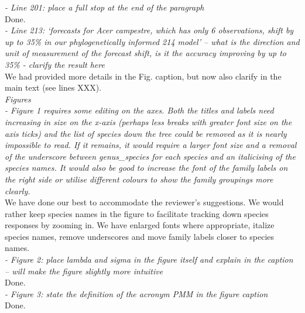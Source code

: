\documentclass[11pt]{article}
\begin{document}

\emph{- Line 201: place a full stop at the end of the paragraph}\\
Done.\\

\emph{- Line 213: ‘forecasts for Acer campestre, which has only 6 observations, shift by up to 35\% in our phylogenetically informed 214 model’ – what is the direction and unit of measurement of the forecast shift, is it the accuracy improving by up to 35\% - clarify the result here}\\
We had provided more details in the Fig. caption, but now also clarify in the main text (see lines XXX).\\


\emph{Figures}\\
\emph{- Figure 1 requires some editing on the axes. Both the titles and labels need increasing in size on the x-axis (perhaps less breaks with greater font size on the axis ticks) and the list of species down the tree could be removed as it is nearly impossible to read. If it remains, it would require a larger font size and a removal of the underscore between genus\_species for each species and an italicising of the species names. It would also be good to increase the font of the family labels on the right side or utilise different colours to show the family groupings more clearly.}\\
We have done our best to accommodate the reviewer's suggestions. We would rather keep species names in the figure to facilitate tracking down species responses by zooming in. We have enlarged fonts where appropriate, italize species names, remove underscores and move family labels closer to species names.\\

\emph{- Figure 2: place lambda and sigma in the figure itself and explain in the caption – will make the figure slightly more intuitive}\\
Done.\\

\emph{- Figure 3: state the definition of the acronym PMM in the figure caption}\\
Done.\\
\end{document}
